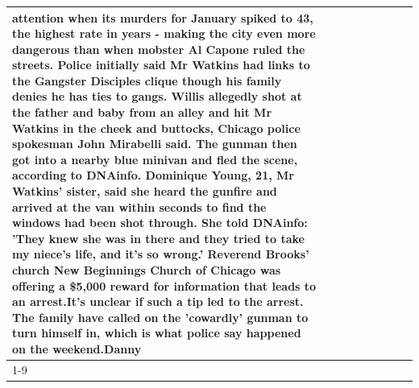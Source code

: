 \begin{table}[H]
\begin{tabular}{lllrlllll}
attention when its murders for January spiked to 43, the highest rate in years - making the city even more dangerous than when mobster Al Capone ruled the streets. Police initially said Mr Watkins had links to the Gangster Disciples clique though his family denies he has ties to gangs. Willis allegedly shot at the father and baby from an alley and hit Mr Watkins in the cheek and buttocks, Chicago police spokesman John Mirabelli said. The gunman then got into a nearby blue minivan and fled the scene, according to DNAinfo. Dominique Young, 21, Mr Watkins' sister, said she heard the gunfire and arrived at the van within seconds to find the windows had been shot through. She told DNAinfo: 'They knew she was in there and they tried to take my niece's life, and it's so wrong.' Reverend Brooks' church New Beginnings Church of Chicago was offering a \$5,000 reward for information that leads to an arrest.It's unclear if such a tip led to the arrest. The family have called on the 'cowardly' gunman to turn himself in, which is what police say happened on the weekend.Danny \\
\cline{1-9}

\end{tabular}
\end{table}
